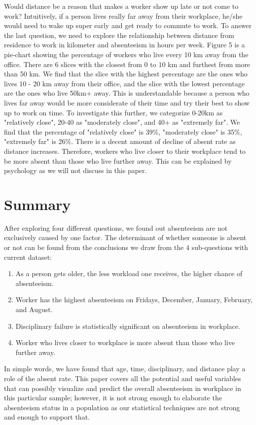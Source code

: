 \documentclass{article}
\begin{document}
Would distance be a reason that makes a worker show up late or not come to work? Intuitively, if a person lives really far away from their workplace, he/she would need to wake up super early and get ready to commute to work. To answer the last question, we need to explore the relationship between distance from residence to work in kilometer and absenteeism in hours per week. Figure 5 is a pie-chart showing the percentage of workers who live every 10 km away from the office. There are 6 slices with the closest from 0 to 10 km and furthest from more than 50 km. We find that the slice with the highest percentage are the ones who lives 10 - 20 km away from their office, and the slice with the lowest percentage are the ones who live 50km+ away. This is understandable because a person who lives far away would be more considerate of their time and try their best to show up to work on time. To investigate this further, we categorize 0-20km as "relatively close", 20-40 as "moderately close", and 40+ as "extremely far". We find that the percentage of "relatively close" is 39\%, "moderately close" is 35\%, "extremely far" is 26\%. There is a decent amount of decline of absent rate as distance increases. Therefore, workers who live closer to their workplace tend to be more absent than those who live further away. This can be explained by psychology as we will not discuss in this paper.

\section{Summary}

After exploring four different questions, we found out absenteeism are not exclusively caused by one factor. The determinant of whether someone is absent or not can be found from the conclusions we draw from the 4 sub-questions with current dataset: 
\begin{enumerate}
    \item As a person gets older, the less workload one receives, the higher chance of absenteeism.
    \item Worker has the highest absenteeism on Fridays, December, January, February, and August.
    \item Disciplinary failure is statistically significant on absenteeism in workplace.
    \item Worker who lives closer to workplace is more absent than those who live further away.
\end{enumerate}
In simple words, we have found that age, time, disciplinary, and distance play a role of the absent rate. This paper covers all the potential and useful variables that can possibly visualize and predict the overall absenteeism in workplace in this particular sample; however, it is not strong enough to elaborate the absenteeism status in a population as our statistical techniques are not strong and enough to support that.



\end{document}
